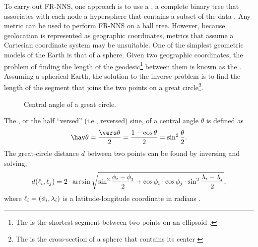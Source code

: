To carry out FR-NNS, one approach is to use a , a complete binary tree that associates with each node a hypersphere that contains a subset of the data \citep{Omohundro1989, Neeraj2008, Kibriya2007}. Any metric can be used to perform FR-NNS on a ball tree. However, because geolocation is represented as geographic coordinates, metrics that assume a Cartesian coordinate system may be unsuitable. One of the simplest geometric models of the Earth is that of a sphere. Given two geographic coordinates, the problem of finding the length of the geodesic\footnote{The  is the shortest segment between two points on an ellipsoid \citep{Lu2014}.} between them is known as the  \citep{Sjoberg2012}. Assuming a spherical Earth, the solution to the inverse problem is to find the length of the segment that joins the two points on a great circle\footnote{The  is the cross-section of a sphere that contains its center \citep{Lu2014}}.

	\def\myrad{2.25cm}%
	\def\myang{60}%
	\begin{figure}[ht!]
	\centering
	\caption[Central angle of a great circle]{Central angle of a great circle.}
	\label{fig:central-angle}
	\end{figure}
The , or the half ``versed'' (i.e., reversed) sine, of a central angle $\theta$ is defined as
	\begin{equation}
		\hav \theta = \frac{\vers \theta}{2}  = \frac{1 - \cos \theta}{2}= \sin^2 \frac{\theta}{2}. \label{eq:hav}
	\end{equation}
The great-circle distance $d$ between two points can be found by inversing  and solving,
	\begin{equation*}
		d(\ell_i, \ell_j) = 2 \cdot \arcsin \sqrt{\sin^2 \frac{\phi_i - \phi_j}{2} + \cos \phi_i \cdot \cos\phi_j \cdot \sin^2 \frac{\lambda_i - \lambda_j}{2}},
	\end{equation*}
where $\ell_i = (\phi_i, \lambda_i)$ is a latitude-longitude coordinate in radians \cite[pp. 157--162]{Brummelen2013}.

